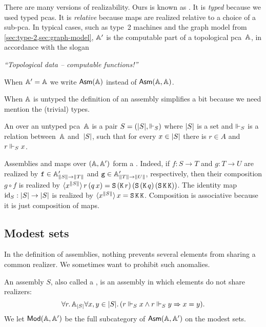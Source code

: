 There are many versions of realizability. Ours is known as . It is \emph{typed}
because we used typed pcas. It is \emph{relative} because maps are realized relative to a choice of a sub-pca. In
typical cases, such as type~2 machines and the graph model from \cref{sec:type-2,sec:graph-model}, $\subAA$ is the
computable part of a topological pca~$\AA$, in accordance with the slogan
%
\begin{center}
  \emph{``Topological data -- computable functions!''}
\end{center}

When $\subAA = \AA$ we write $\Asm{\AA}$ instead of $\Asm{\AA,\AA}$.

When $\AA$ is untyped the definition of an assembly simplifies a bit because we need mention the (trivial) types.

\begin{definition}
  An  over an untyped pca~$\AA$ is a pair $S = (\S{S}, {\rz[S]})$ where $\S{S}$ is a set and $\rz[S]$ is a relation between~$\AA$ and~$\S{S}$, such that for every $x \in \S{S}$ there is $r \in A$ and $r \rz[S] x$.
\end{definition}

Assemblies and maps over $(\AA, \subAA)$ form a .
%
Indeed, if $f : S \to T$ and $g : T \to U$ are realized by $\R{f} \in \subAtyp{\T{S} \to \T{T}}$
and $\R{g} \in \subAtyp{\T{T} \to \T{U}}$, respectively, then their composition $g \circ f$ is realized by
$\tpcalam{x}{\T{S}}{r\,(q\,x)} = \combS\,(\combK\,r)\,(\combS\,(\combK\,q)\,(\combS\,\combK\,\combK))$.
%
The identity map $\id[S] : \S{S} \to \S{S}$ is realized by $\tpcalam{x}{\T{S}}{x} = \combS\,\combK\,\combK$. 
%
Composition is associative because it is just composition of maps.

\subsection{Modest sets}
\label{sec:modest-sets}

In the definition of assemblies, nothing prevents several elements from sharing a common realizer. We sometimes want
to prohibit such anomalies.

\begin{definition}
  An  assembly $S$, also called a , is an assembly in which elements do not share realizers:
  \begin{equation*}
    \all{r}{\xAtyp{S}}{
      \all{x,y \in \S{S}}
      (r \rz[S] x \land r \rz[S] y \lthen x = y)
    }.
  \end{equation*}
  We let $\ModA$ be the full subcategory of $\AsmA$ on the modest sets.
\end{definition}

